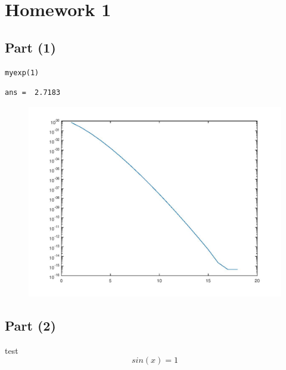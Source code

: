 \documentclass[10pt]{article}
\begin{document}
{\Huge\section*{Homework 1}}

\tableofcontents
\vspace*{4em}



{}
\subsection*{Part (1)}

\begin{lstlisting}
myexp(1)
\end{lstlisting}
\begin{lstlisting}[language={},xleftmargin=5pt,frame=none]
ans =  2.7183

\end{lstlisting}
\begin{figure}[!ht]
\includegraphics[width=\textwidth]{myscript-1.jpg}
\end{figure}


{}
\subsection*{Part (2)}



test $$sin(x) = 1$$
\end{document}
